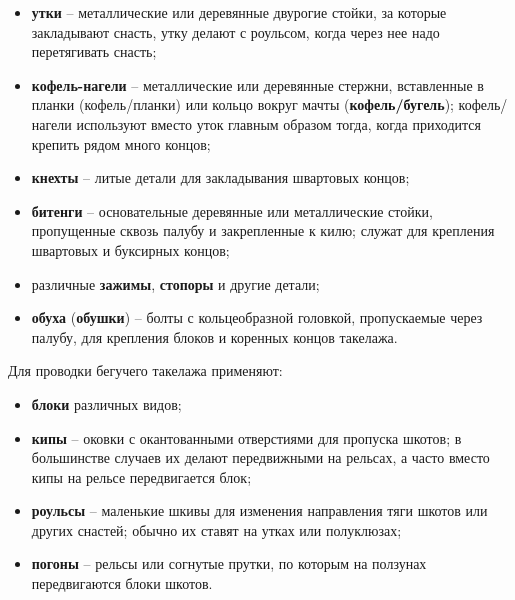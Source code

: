 \documentclass[a4paper, 12pt, twoside, final]{scrbook}
\begin{document}
\begin{itemize}
\item \textbf{утки} \--- металлические или деревянные двурогие стойки, за которые закладывают снасть, утку делают с роульсом, когда через нее надо перетягивать снасть;{\sloppy\par}
\item \textbf{кофель-нагели} \--- металлические или деревянные стержни, вставленные в планки (кофель\-/планки) или кольцо вокруг мачты (\textbf{кофель\-/бугель}); кофель\-/нагели используют вместо уток главным образом тогда, когда приходится крепить рядом много концов;
\item \textbf{кнехты} \--- литые детали для закладывания швартовых концов;
\item \textbf{битенги} \--- основательные деревянные или металлические стойки, пропущенные сквозь палубу и закрепленные к килю; служат для крепления швартовых и буксирных концов;
\item различные \textbf{зажимы}, \textbf{стопоры} и другие детали;
\item \textbf{обуха} (\textbf{обушки}) \--- болты с кольцеобразной головкой, пропускаемые через палубу, для крепления блоков и коренных концов такелажа.
\end{itemize}

Для проводки бегучего такелажа применяют:

\begin{itemize}
\item \textbf{блоки} различных видов;
\item \textbf{кипы} \--- оковки с окантованными отверстиями для пропуска шкотов; в большинстве случаев их делают передвижными на рельсах, а часто вместо кипы на рельсе передвигается блок;
\item \textbf{роульсы} \--- маленькие шкивы для изменения направления тяги шкотов или других снастей; обычно их ставят на утках или полуклюзах;
\item \textbf{погоны} \--- рельсы или согнутые прутки, по которым на ползунах передвигаются блоки шкотов.
\end{itemize}
\end{document}
